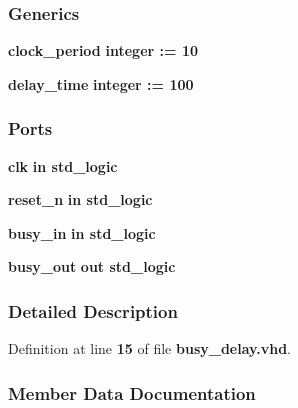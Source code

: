 \subsubsection*{Generics}
 \begin{DoxyCompactItemize}
\item 
{\bf clock\+\_\+period} {\bfseries {\bfseries \textcolor{comment}{integer}\textcolor{vhdlchar}{ }\textcolor{vhdlchar}{ }\textcolor{vhdlchar}{\+:}\textcolor{vhdlchar}{=}\textcolor{vhdlchar}{ }\textcolor{vhdlchar}{ } \textcolor{vhdldigit}{10} \textcolor{vhdlchar}{ }}}
\item 
{\bf delay\+\_\+time} {\bfseries {\bfseries \textcolor{comment}{integer}\textcolor{vhdlchar}{ }\textcolor{vhdlchar}{ }\textcolor{vhdlchar}{\+:}\textcolor{vhdlchar}{=}\textcolor{vhdlchar}{ }\textcolor{vhdlchar}{ } \textcolor{vhdldigit}{100} \textcolor{vhdlchar}{ }}}
\end{DoxyCompactItemize}
\subsubsection*{Ports}
 \begin{DoxyCompactItemize}
\item 
{\bf clk}  {\bfseries {\bfseries \textcolor{keywordflow}{in}\textcolor{vhdlchar}{ }}} {\bfseries \textcolor{comment}{std\+\_\+logic}\textcolor{vhdlchar}{ }} 
\item 
{\bf reset\+\_\+n}  {\bfseries {\bfseries \textcolor{keywordflow}{in}\textcolor{vhdlchar}{ }}} {\bfseries \textcolor{comment}{std\+\_\+logic}\textcolor{vhdlchar}{ }} 
\item 
{\bf busy\+\_\+in}  {\bfseries {\bfseries \textcolor{keywordflow}{in}\textcolor{vhdlchar}{ }}} {\bfseries \textcolor{comment}{std\+\_\+logic}\textcolor{vhdlchar}{ }} 
\item 
{\bf busy\+\_\+out}  {\bfseries {\bfseries \textcolor{keywordflow}{out}\textcolor{vhdlchar}{ }}} {\bfseries \textcolor{comment}{std\+\_\+logic}\textcolor{vhdlchar}{ }} 
\end{DoxyCompactItemize}


\subsubsection{Detailed Description}


Definition at line {\bf 15} of file {\bf busy\+\_\+delay.\+vhd}.



\subsubsection{Member Data Documentation}
